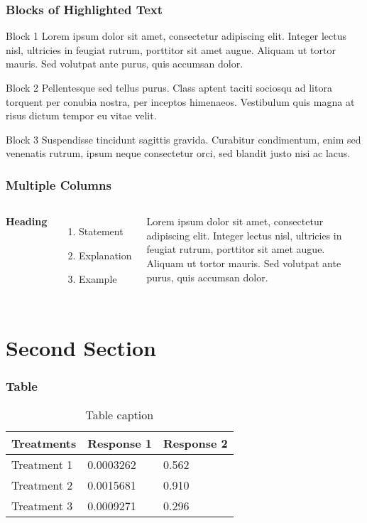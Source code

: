 \documentclass{beamer}
\begin{document}
\begin{frame}
\frametitle{Blocks of Highlighted Text}
\begin{block}{Block 1}
Lorem ipsum dolor sit amet, consectetur adipiscing elit. Integer lectus nisl, ultricies in feugiat rutrum, porttitor sit amet augue. Aliquam ut tortor mauris. Sed volutpat ante purus, quis accumsan dolor.
\end{block}

\begin{block}{Block 2}
Pellentesque sed tellus purus. Class aptent taciti sociosqu ad litora torquent per conubia nostra, per inceptos himenaeos. Vestibulum quis magna at risus dictum tempor eu vitae velit.
\end{block}

\begin{block}{Block 3}
Suspendisse tincidunt sagittis gravida. Curabitur condimentum, enim sed venenatis rutrum, ipsum neque consectetur orci, sed blandit justo nisi ac lacus.
\end{block}
\end{frame}


\begin{frame}
\frametitle{Multiple Columns}
\begin{columns}[c] %

\textbf{Heading}
\begin{enumerate}
\item Statement
\item Explanation
\item Example
\end{enumerate}

Lorem ipsum dolor sit amet, consectetur adipiscing elit. Integer lectus nisl, ultricies in feugiat rutrum, porttitor sit amet augue. Aliquam ut tortor mauris. Sed volutpat ante purus, quis accumsan dolor.

\end{columns}
\end{frame}

\section{Second Section}

\begin{frame}
\frametitle{Table}
\begin{table}
\begin{tabular}{l l l}
\toprule
\textbf{Treatments} & \textbf{Response 1} & \textbf{Response 2}\\
\midrule
Treatment 1 & 0.0003262 & 0.562 \\
Treatment 2 & 0.0015681 & 0.910 \\
Treatment 3 & 0.0009271 & 0.296 \\
\bottomrule
\end{tabular}
\caption{Table caption}
\end{table}
\end{frame}
\end{document}

